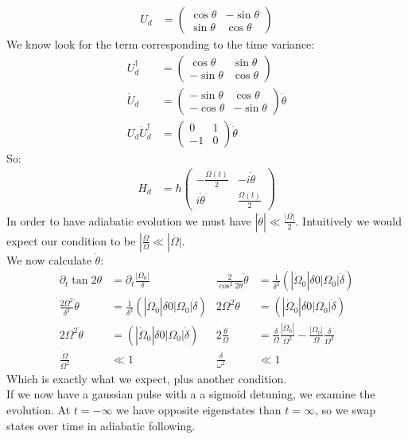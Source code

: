 \begin{align*}
	U_d &= \begin{pmatrix}
		\cos\theta & -\sin\theta \\
		\sin\theta & \cos\theta
	\end{pmatrix}
\end{align*}
We know look for the term corresponding to the time variance:
\begin{align*}
	U_d^\dagger &= \begin{pmatrix}
		\cos\theta & \sin\theta \\
		-\sin\theta & \cos\theta
		\end{pmatrix}\\
	\dot{U}_d &= \begin{pmatrix}
		-\sin\theta & \cos\theta \\
		-\cos\theta & -\sin\theta
	\end{pmatrix}\dot{\theta} \\
		U_d\dot{U}_d^\dagger &= \begin{pmatrix}
			0 & 1 \\
			-1 & 0
		\end{pmatrix} \dot{\theta}
\end{align*}
So:
\begin{align*}
	H_d &= \hbar \begin{pmatrix}
		-\frac{\Omega(t)}{2} & -i\dot{\theta} \\
		i\dot{\theta} & \frac{\Omega(t)}{2}
	      \end{pmatrix}
\end{align*}
In order to have adiabatic evolution we must have $|\dot{\theta}| \ll \frac{|\Omega|}{2}$. Intuitively we would expect our condition to be $|\frac{\dot{\Omega}}{\Omega} \ll |\Omega|$. \\
We now calculate $\dot{\theta}$:
\begin{align*}
	\partial_t \tan 2\theta &= \partial_t \frac{|\Omega_0|}{\delta} &
	\frac{2}{\cos^2 2\theta} \dot{\theta} &= \frac{1}{\delta^2}\left(|\dot{\Omega}_0|\delta 0 |\Omega_0|\dot{\delta}\right) \\
	\frac{2\Omega^2}{\delta^2} \dot{\theta} &= \frac{1}{\delta^2}\left(|\dot{\Omega}_0|\delta 0 |\Omega_0|\dot{\delta}\right) &
	2\Omega^2\dot{\theta} &= \left(|\dot{\Omega}_0|\delta 0 |\Omega_0|\dot{\delta}\right) \\
	2\Omega^2\dot{\theta} &= \left(|\dot{\Omega}_0|\delta 0 |\Omega_0|\dot{\delta}\right) &
	2\frac{\dot{\theta}}{\Omega} &= \frac{\delta}{\Omega} \frac{|\dot{\Omega_0}|}{\Omega^2} - \frac{|\Omega_0|}{\Omega} \frac{\dot{\delta}}{\Omega^2}  \\
	\frac{\dot{\Omega}}{\Omega^2} &\ll 1 &
	\frac{\dot{\delta}}{\omega^2} &\ll 1
\end{align*}
Which is exactly what we expect, plus another condition. \\
If we now have a gaussian pulse with a a sigmoid detuning, we examine the evolution. At $t=-\infty$ we have opposite eigenstates than $t=\infty$, so we swap states over time in adiabatic following.
